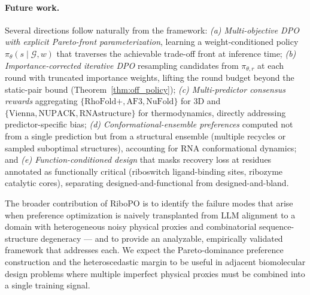 \paragraph{Future work.}
Several directions follow naturally from the framework: \emph{(a) Multi-objective DPO with explicit Pareto-front parameterization}, learning a weight-conditioned policy $\pi_\theta(s\mid\mathcal{G}, w)$ that traverses the achievable trade-off front at inference time; \emph{(b) Importance-corrected iterative DPO} resampling candidates from $\pi_{\theta, r}$ at each round with truncated importance weights, lifting the round budget beyond the static-pair bound (Theorem~\ref{thm:off_policy}); \emph{(c) Multi-predictor consensus rewards} aggregating $\{\text{RhoFold+}, \text{AF3}, \text{NuFold}\}$ for 3D and $\{\text{Vienna}, \text{NUPACK}, \text{RNAstructure}\}$ for thermodynamics, directly addressing predictor-specific bias; \emph{(d) Conformational-ensemble preferences} computed not from a single prediction but from a structural ensemble (multiple recycles or sampled suboptimal structures), accounting for RNA conformational dynamics; and \emph{(e) Function-conditioned design} that masks recovery loss at residues annotated as functionally critical (riboswitch ligand-binding sites, ribozyme catalytic cores), separating designed-and-functional from designed-and-bland.

The broader contribution of RiboPO is to identify the failure modes that arise when preference optimization is naively transplanted from LLM alignment to a domain with heterogeneous noisy physical proxies and combinatorial sequence-structure degeneracy --- and to provide an analyzable, empirically validated framework that addresses each. We expect the Pareto-dominance preference construction and the heteroscedastic margin to be useful in adjacent biomolecular design problems where multiple imperfect physical proxies must be combined into a single training signal.
